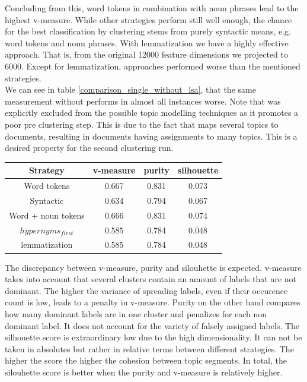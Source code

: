   Concluding from this, word tokens in combination with noun phrases lead to the highest v-measure. While other strategies perform still well enough, the chance for the best classification by clustering stems from purely syntactic means, e.g. word tokens and noun phrases. With \wordnet{} lemmatization we have a highly effective approach. That is, from the original 12000 feature dimensions we projected to 6000. Except for lemmatization, \wordnet{} approaches performed worse than the mentioned strategies.\\
  We can see in table \ref{comparison_single_without_lsa}, that the same measurement without \lsa{} performs in almost all instances worse. Note that \lda{} was explicitly excluded from the possible topic modelling techniques as it promotes a poor pre clustering step. This is due to the fact that \lda{} maps several topics to documents, resulting in documents having assignments to many topics. This is a desired property for the second clustering run.

    \begin{center}\label{comparison_single_without_lsa}
      \begin{tabular}{ c | c | c | c }
      Strategy    & v-measure & purity  & silhouette \\ \hline
      Word tokens & 0.667     & 0.831   & 0.073      \\
      Syntactic   & 0.634     & 0.794     & 0.067 \\
      Word + noun tokens & 0.666   & 0.831     & 0.074 \\
      \wordnet{} $hypernyms_{first}$ & 0.585   & 0.784     & 0.048 \\
      \wordnet{} lemmatization   & 0.585   & 0.784     & 0.048 \\
      \end{tabular}
    \end{center}

  The discrepancy between v-measure, purity and silouhette is expected. v-measure takes into account that several clusters contain an amount of labels that are not dominant. The higher the variance of spreading labels, even if their occurence count is low, leads to a penalty in v-measure. Purity on the other hand compares how many dominant labels are in one cluster and penalizes for each non dominant label. It does not account for the variety of falsely assigned labels. The silhouette score is extraordinary low due to the high dimensionality. It can not be taken in absolutes but rather in relative terms between different strategies. The higher the score the higher the cohesion between topic segments. In total, the silouhette score is better when the purity and v-measure is relatively higher.


